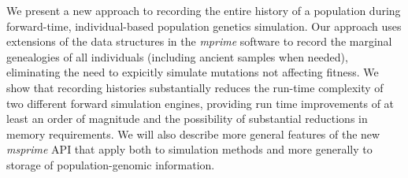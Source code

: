 \documentclass{article}
\begin{document}
We present a new approach to recording the entire history of a population during forward-time, individual-based
population genetics simulation.  Our approach uses extensions of the data structures in the \emph{mprime} software to
record the marginal genealogies of all individuals (including ancient samples when needed), eliminating the need to
expicitly simulate mutations not affecting fitness.  We show that recording histories substantially reduces the run-time
complexity of two different forward simulation engines, providing run time improvements of at least an order of
magnitude and the possibility of substantial reductions in memory requirements.  We will also describe more general
features of the new \emph{msprime} API that apply both to simulation methods and more generally to storage of
population-genomic information.
\end{document}
